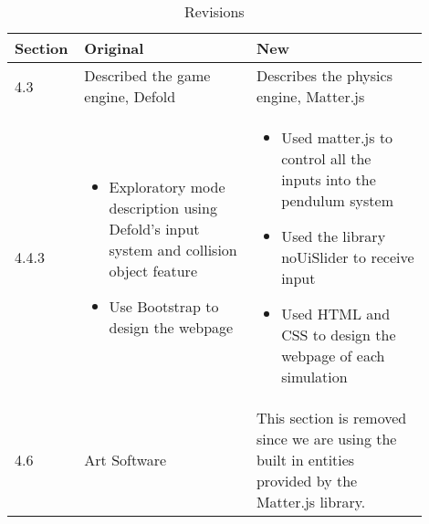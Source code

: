 \begin{table}[H]
  \centering
  \caption{Revisions}
  \label{my-label}
  \begin{tabular}{|p{0.1\linewidth}|p{0.4\linewidth}|p{0.4\linewidth}|}
    \hline
    \textbf{Section} & \textbf{Original} & \textbf{New} \\
    \hline

    4.3 & 
    Described the game engine, Defold & 
    Describes the physics engine, Matter.js \\
    \hline
    4.4.3 &
    \begin{itemize}
        \item Exploratory mode description using Defold's input system and collision object feature
        \item Use Bootstrap to design the webpage
    \end{itemize}
     &
    \begin{itemize}
        \item Used matter.js to control all the inputs into the pendulum system
        \item Used the library noUiSlider to receive input 
        \item Used HTML and CSS to design the webpage of each simulation
    \end{itemize}\\
    \hline
    4.6 &
    Art Software &
    This section is removed since we are using the built in 
    entities provided by the Matter.js library.\\
    \hline


    

  \end{tabular}
\end{table}